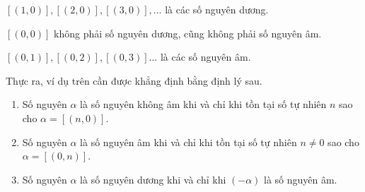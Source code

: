 \begin{example}
	$[(1, 0)], [(2, 0)], [(3, 0)], \ldots$ là các số nguyên dương.

	$[(0,0)]$ không phải số nguyên dương, cũng không phải số nguyên âm.

	$[(0, 1)], [(0, 2)], [(0, 3)] \ldots$ là các số nguyên âm.
\end{example}

\noindent Thực ra, ví dụ trên cần được khẳng định bằng định lý sau.

\begin{theorem}\label{theorem:positive-negative-nonnegative-integers}
	\begin{enumerate}[label={(\roman*)}]
		\item Số nguyên $\alpha$ là số nguyên không âm khi và chỉ khi tồn tại số tự nhiên $n$ sao cho $\alpha = [(n, 0)]$.
		\item Số nguyên $\alpha$ là số nguyên âm khi và chỉ khi tồn tại số tự nhiên $n\ne 0$ sao cho $\alpha = [(0, n)]$.
		\item Số nguyên $\alpha$ là số nguyên dương khi và chỉ khi $(-\alpha)$ là số nguyên âm.
	\end{enumerate}
\end{theorem}

